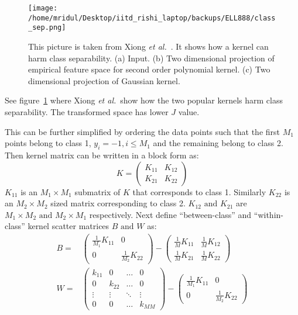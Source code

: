 \documentclass[11pt]{article}
\newcommand{\etal}{{\em et al.}}
\begin{document}
\begin{figure}[!htbp]
    \centering
    \texttt{[image: /home/mridul/Desktop/iitd\_rishi\_laptop/backups/ELL888/class\_sep.png]}
    \caption{\label{fig:6}This picture is taken from Xiong {\em et
    al.}~\cite{xiong}.  It shows how a kernel can harm class separability. (a)
    Input. (b) Two dimensional projection of empirical feature space for second
    order polynomial kernel. (c) Two dimensional projection of Gaussian kernel.}
\end{figure}
See figure~\ref{fig:6} where Xiong \etal\ show how the two popular kernels harm class separability. The transformed space has lower $J$ value.
\afterpage{\clearpage}
\par
This can be further simplified by ordering the data points such that the first
$M_1$ points belong to class 1, $y_i=-1,i\le M_1$ and the remaining belong to
class 2. Then kernel matrix can be written in a block form as:
\[K=\begin{pmatrix}K_{11}&K_{12}\\K_{21}&K_{22}\end{pmatrix}\]
$K_{11}$ is an $M_1\times M_1$ submatrix of $K$ that corresponds to class 1.
Similarly $K_{22}$ is an $M_2\times M_2$ sized matrix corresponding to class 2.
$K_{12}\text{ and }K_{21}$ are $M_1\times M_2\text{ and }M_2\times M_1$
respectively. Next define ``between\nobreakdash-class'' and ``within\nobreakdash-class'' kernel scatter
matrices $B\text{ and }W$ as:
\begin{align}
    \label{eq:B}B=&\begin{pmatrix}
        \frac{1}{M_1}K_{11}&0\\
        0&\frac{1}{M_2}K_{22}
        \end{pmatrix}-\begin{pmatrix}
            \frac{1}{M}K_{11}&\frac{1}{M}K_{12}\\
            \frac{1}{M}K_{21}&\frac{1}{M}K_{22}
    \end{pmatrix}\\
    \label{eq:W}W=&\begin{pmatrix}
        k_{11} & 0 & \dots & 0\\
        0 & k_{22} & \dots & 0\\
        \vdots & \vdots & \ddots & \vdots\\
        0 & 0 & \dots & k_{MM}
        \end{pmatrix}-\begin{pmatrix}\frac{1}{M_1}K_{11}&0\\0&\frac{1}{M_2}K_{22}\end{pmatrix}
\end{align}
\end{document}
